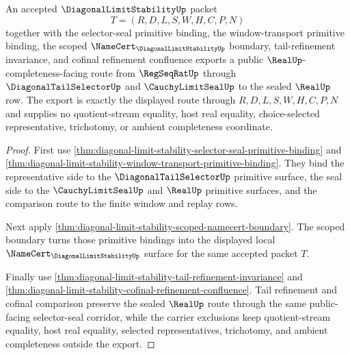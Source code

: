 \begin{theorem}
\label{thm:diagonal-limit-stability-public-export}
An accepted $\DiagonalLimitStabilityUp$ packet
$$
T=(R,D,L,S,W,H,C,P,N)
$$
together with the selector-seal primitive binding, the window-transport primitive binding, the scoped $\NameCert_{\DiagonalLimitStabilityUp}$ boundary, tail-refinement invariance, and cofinal refinement confluence exports a public $\RealUp$-completeness-facing route from $\RegSeqRatUp$ through $\DiagonalTailSelectorUp$ and $\CauchyLimitSealUp$ to the sealed $\RealUp$ row. The export is exactly the displayed route through $R,D,L,S,W,H,C,P,N$ and supplies no quotient-stream equality, host real equality, choice-selected representative, trichotomy, or ambient completeness coordinate.
\end{theorem}
\begin{proof}
First use \autoref{thm:diagonal-limit-stability-selector-seal-primitive-binding} and \autoref{thm:diagonal-limit-stability-window-transport-primitive-binding}. They bind the representative side to the $\DiagonalTailSelectorUp$ primitive surface, the seal side to the $\CauchyLimitSealUp$ and $\RealUp$ primitive surfaces, and the comparison route to the finite window and replay rows.

Next apply \autoref{thm:diagonal-limit-stability-scoped-namecert-boundary}. The scoped boundary turns those primitive bindings into the displayed local $\NameCert_{\DiagonalLimitStabilityUp}$ surface for the same accepted packet $T$.

Finally use \autoref{thm:diagonal-limit-stability-tail-refinement-invariance} and \autoref{thm:diagonal-limit-stability-cofinal-refinement-confluence}. Tail refinement and cofinal comparison preserve the sealed $\RealUp$ route through the same public-facing selector-seal corridor, while the carrier exclusions keep quotient-stream equality, host real equality, selected representatives, trichotomy, and ambient completeness outside the export.
\end{proof}

